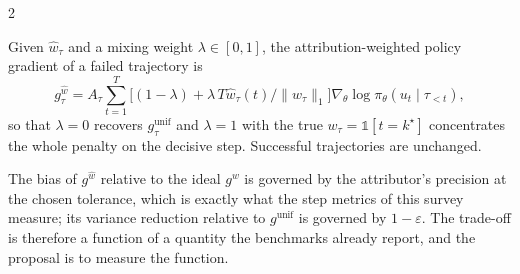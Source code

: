 \begin{multicols}{2}
\begin{definition}\label{def:attrgrad}
Given $\hat w_\tau$ and a mixing weight $\lambda\in[0,1]$, the attribution-weighted policy gradient of a failed trajectory is
\[g^{\hat w}_\tau=A_\tau\sum_{t=1}^{T}\big[(1-\lambda)+\lambda\,T\hat w_\tau(t)/\|\hat w_\tau\|_1\big]\nabla_\theta\log\pi_\theta(u_t\mid\tau_{<t}),\]
so that $\lambda=0$ recovers $g^{\mathrm{unif}}_\tau$ and $\lambda=1$ with the true $w_\tau=\mathbb{1}[t=k^\star]$ concentrates the whole penalty on the decisive step. Successful trajectories are unchanged.
\end{definition}

The bias of $g^{\hat w}$ relative to the ideal $g^{w}$ is governed by the attributor's precision at the chosen tolerance, which is exactly what the step metrics of this survey measure; its variance reduction relative to $g^{\mathrm{unif}}$ is governed by $1-\varepsilon$. The trade-off is therefore a function of a quantity the benchmarks already report, and the proposal is to measure the function.


\end{multicols}
